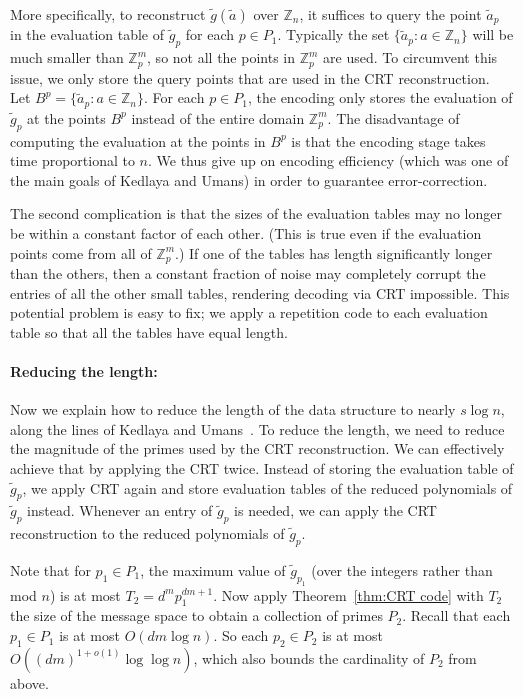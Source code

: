 \documentclass[11pt,english]{article}
\theoremstyle{definition}
\theoremstyle{remark}
\newcommand{\Z}{\mathbb{Z}}
\begin{document}
More specifically, to reconstruct $\tilde{g}(\tilde{a})$ over $\Z_{n}$,
it suffices to query the point $\tilde{a}_{p}$ in the evaluation
table of $\tilde{g}_{p}$ for each $p\in P_{1}$. Typically the set $\{\tilde{a}_{p} : a\in\Z_{n}\}$ 
will be much smaller than $\Z_{p}^{m}$, so not all the points in $\Z_{p}^{m}$
are used. To circumvent this issue, we only store the query points
that are used in the CRT reconstruction. Let $B^{p}=\{\tilde{a}_{p}:a\in\Z_{n}\}$.
For each $p\in P_{1}$, the encoding only stores the evaluation of
$\tilde{g}_{p}$ at the points $B^{p}$ instead of the entire domain
$\Z_{p}^{m}$. The disadvantage of computing the evaluation at the
points in $B^{p}$ is that the encoding stage takes time proportional
to $n$. We thus give up on encoding efficiency (which was one of the main goals
of Kedlaya and Umans) in order to guarantee error-correction.

The second complication is that the sizes of the evaluation tables
may no longer be within a constant factor of each other. (This is
true even if the evaluation points come from all of $\Z_{p}^{m}$.)
If one of the tables has length significantly longer than the others,
then a constant fraction of noise may completely corrupt the entries
of all the other small tables, rendering decoding via CRT impossible.
This potential problem is easy to fix; we apply a repetition code
to each evaluation table so that all the tables have equal length.

\paragraph{\textbf{Reducing the length:}}
Now we explain how to reduce the length of the data structure to nearly
$s\log n$, along the lines of Kedlaya and Umans~\cite{kedl-umans}. To reduce the length, we need to reduce the magnitude
of the primes used by the CRT reconstruction. We can effectively achieve
that by applying the CRT twice. Instead of storing the evaluation
table of $\tilde{g}_{p}$, we apply CRT again and store evaluation
tables of the reduced polynomials of $\tilde{g}_{p}$ instead. Whenever
an entry of $\tilde{g}_{p}$ is needed, we can apply the CRT reconstruction to the
reduced polynomials of $\tilde{g}_{p}$. 

Note that for $p_{1}\in P_{1}$, the maximum value of $\tilde{g}_{p_{1}}$ (over the integers rather than mod $n$)
is at most $T_{2}=d^{m}p_{1}^{dm+1}$. Now apply Theorem~\ref{thm:CRT code}
with $T_{2}$ the size of the message space to obtain a collection
of primes $P_{2}$. Recall that each $p_{1}\in P_{1}$ is at most
$O(dm\log n)$. So each $p_{2}\in P_{2}$ is at most $O((dm)^{1+o(1)}\log\log n)$,
which also bounds the cardinality of $P_{2}$ from above. 
\end{document}

